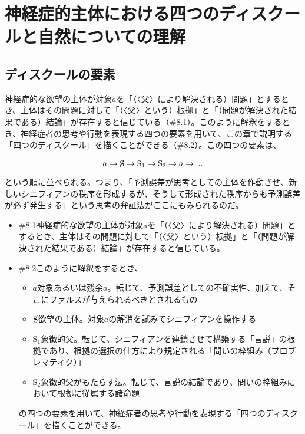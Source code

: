\section{神経症的主体における四つのディスクールと自然についての理解}\label{ux795eux7d4cux75c7ux7684ux4e3bux4f53ux306bux304aux3051ux308bux56dbux3064ux306eux30c7ux30a3ux30b9ux30afux30fcux30ebux3068ux81eaux7136ux306bux3064ux3044ux3066ux306eux7406ux89e3}

\subsection{ディスクールの要素}\label{ux30c7ux30a3ux30b9ux30afux30fcux30ebux306eux8981ux7d20}

神経症的な欲望の主体が対象\(a\)を「（〈父〉により解決される）問題」とするとき、主体はその問題に対して「（〈父〉という）根拠」と「（問題が解決された結果である）結論」が存在すると信じている（\#8.1）。このように解釈をするとき、神経症者の思考や行動を表現する四つの要素を用いて、この章で説明する「四つのディスクール」を描くことができる（\#8.2）。この四つの要素は、

\[a \rightarrow \cancel{\textrm{S}} \rightarrow \textrm{S}_1 \rightarrow \textrm{S}_2 \rightarrow a \rightarrow ...\]

という順に並べられる。つまり、「予測誤差が思考としての主体を作動させ、新しいシニフィアンの秩序を形成するが、そうして形成された秩序からも予測誤差が必ず発生する」という思考の弁証法がここにもみられるのだ。

\begin{note}{}
  \begin{itemize}
    \tightlist
    \item{\#8.1}神経症的な欲望の主体が対象aを「（〈父〉により解決される）問題」とするとき、主体はその問題に対して「（〈父〉という）根拠」と「（問題が解決された結果である）結論」が存在すると信じている。
    \item{\#8.2}このように解釈をするとき、
      \begin{itemize}
        \tightlist
        \item{$a$}対象あるいは残余$a$。転じて、予測誤差としての不確実性、加えて、そこにファルスが与えられるべきとされるもの
        \item{$\cancel{\textrm{S}}$}欲望の主体。対象$a$の解消を試みてシニフィアンを操作する
        \item{$\textrm{S}_1$}象徴的父。転じて、シニフィアンを連鎖させて構築する「言説」の根拠であり、根拠の選択の仕方により規定される「問いの枠組み（プロブレマティク）」
        \item{$\textrm{S}_2$}象徴的父がもたらす法。転じて、言説の結論であり、問いの枠組みにおいて根拠に従属する諸命題
      \end{itemize}の四つの要素を用いて、神経症者の思考や行動を表現する「四つのディスクール」を描くことができる。
  \end{itemize}
\end{note}

